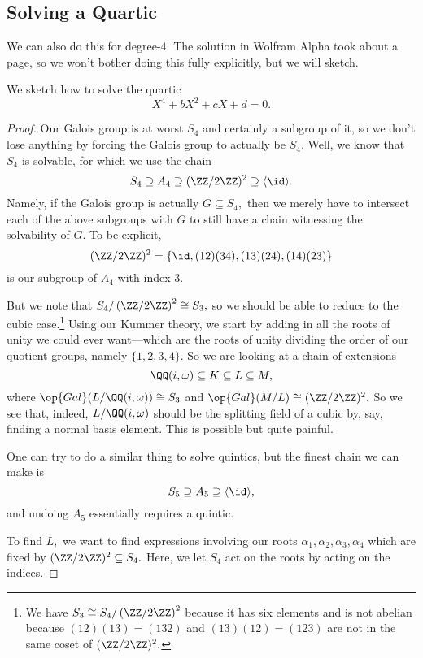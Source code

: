 \subsection{Solving a Quartic}
We can also do this for degree-$4.$ The solution in Wolfram Alpha took about a page, so we won't bother doing this fully explicitly, but we will sketch.
\begin{exe}
	We sketch how to solve the quartic
	\[X^4+bX^2+cX+d=0.\]
\end{exe}
\begin{proof}
	Our Galois group is at worst $S_4$ and certainly a subgroup of it, so we don't lose anything by forcing the Galois group to actually be $S_4.$ Well, we know that $S_4$ is solvable, for which we use the chain
	\[S_4\supseteq A_4\supseteq(\ZZ/2\ZZ)^2\supseteq\langle\id\rangle.\]
	Namely, if the Galois group is actually $G\subseteq S_4,$ then we merely have to intersect each of the above subgroups with $G$ to still have a chain witnessing the solvability of $G.$ To be explicit,
	\[(\ZZ/2\ZZ)^2=\{\id,(12)(34),(13)(24),(14)(23)\}\]
	is our subgroup of $A_4$ with index $3.$

	But we note that $S_4/\left(\ZZ/2\ZZ\right)^2\cong S_3,$ so we should be able to reduce to the cubic case.\footnote{We have $S_3\cong S_4/\left(\ZZ/2\ZZ\right)^2$ because it has six elements and is not abelian because $(12)(13)=(132)$ and $(13)(12)=(123)$ are not in the same coset of $(\ZZ/2\ZZ)^2.$} Using our Kummer theory, we start by adding in all the roots of unity we could ever want---which are the roots of unity dividing the order of our quotient groups, namely $\{1,2,3,4\}.$ So we are looking at a chain of extensions
	\[\QQ(i,\omega)\subseteq K\subseteq L\subseteq M,\]
	where $\op{Gal}(L/\QQ(i,\omega))\cong S_3$ and $\op{Gal}(M/L)\cong(\ZZ/2\ZZ)^2.$ So we see that, indeed, $L/\QQ(i,\omega)$ should be the splitting field of a cubic by, say, finding a normal basis element. This is possible but quite painful.
	\begin{remark}
		One can try to do a similar thing to solve quintics, but the finest chain we can make is
		\[S_5\supseteq A_5\supseteq\langle\id\rangle,\]
		and undoing $A_5$ essentially requires a quintic.
	\end{remark}
	To find $L,$ we want to find expressions involving our roots $\alpha_1,\alpha_2,\alpha_3,\alpha_4$ which are fixed by $(\ZZ/2\ZZ)^2\subseteq S_4.$ Here, we let $S_4$ act on the roots by acting on the indices.
	

\end{proof}
